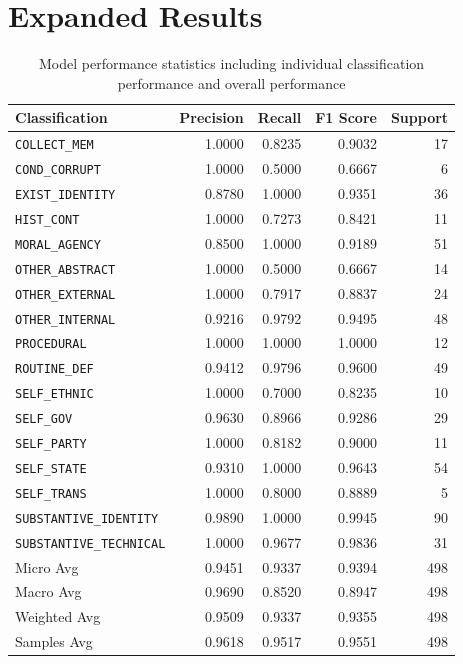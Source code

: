 \chapter{Expanded Results}
\label{chap:expand_results}

\begin{table}[ht]
    \centering
    \caption{Model performance statistics including individual classification performance and overall performance}
    \begin{tabular}{lrrrr}
        \toprule
        Classification & Precision & Recall & F1 Score & Support \\
        \midrule
        \texttt{COLLECT\_MEM}            & 1.0000 & 0.8235 & 0.9032 & 17 \\
        \texttt{COND\_CORRUPT}           & 1.0000 & 0.5000 & 0.6667 & 6 \\
        \texttt{EXIST\_IDENTITY}         & 0.8780 & 1.0000 & 0.9351 & 36 \\
        \texttt{HIST\_CONT}              & 1.0000 & 0.7273 & 0.8421 & 11 \\
        \texttt{MORAL\_AGENCY}           & 0.8500 & 1.0000 & 0.9189 & 51 \\
        \texttt{OTHER\_ABSTRACT}         & 1.0000 & 0.5000 & 0.6667 & 14 \\
        \texttt{OTHER\_EXTERNAL}         & 1.0000 & 0.7917 & 0.8837 & 24 \\
        \texttt{OTHER\_INTERNAL}         & 0.9216 & 0.9792 & 0.9495 & 48 \\
        \texttt{PROCEDURAL}              & 1.0000 & 1.0000 & 1.0000 & 12 \\
        \texttt{ROUTINE\_DEF}            & 0.9412 & 0.9796 & 0.9600 & 49 \\
        \texttt{SELF\_ETHNIC}            & 1.0000 & 0.7000 & 0.8235 & 10 \\
        \texttt{SELF\_GOV}               & 0.9630 & 0.8966 & 0.9286 & 29 \\
        \texttt{SELF\_PARTY}             & 1.0000 & 0.8182 & 0.9000 & 11 \\
        \texttt{SELF\_STATE}             & 0.9310 & 1.0000 & 0.9643 & 54 \\
        \texttt{SELF\_TRANS}             & 1.0000 & 0.8000 & 0.8889 & 5 \\
        \texttt{SUBSTANTIVE\_IDENTITY}    & 0.9890 & 1.0000 & 0.9945 & 90 \\
        \texttt{SUBSTANTIVE\_TECHNICAL}   & 1.0000 & 0.9677 & 0.9836 & 31 \\
        \midrule
        Micro Avg                        & 0.9451 & 0.9337 & 0.9394 & 498 \\
        Macro Avg                        & 0.9690 & 0.8520 & 0.8947 & 498 \\
        Weighted Avg                     & 0.9509 & 0.9337 & 0.9355 & 498 \\
        Samples Avg                      & 0.9618 & 0.9517 & 0.9551 & 498 \\
        \bottomrule   
    \end{tabular}
    \label{tab:model_stat}
    
\end{table}

